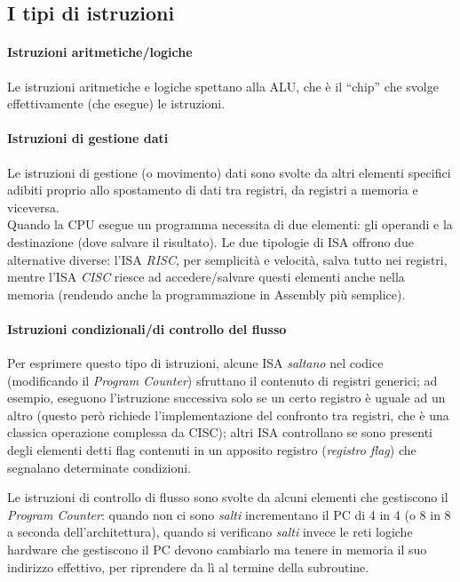 \documentclass[class=book, crop=false, oneside]{standalone}
\begin{document}
\subsection{I tipi di istruzioni}

\paragraph*{Istruzioni aritmetiche/logiche}
Le istruzioni aritmetiche e logiche spettano alla ALU, che è il “chip” che svolge effettivamente (che esegue) le istruzioni.

\paragraph*{Istruzioni di gestione dati}
Le istruzioni di gestione (o movimento) dati sono svolte da altri elementi specifici adibiti proprio allo spostamento di dati tra registri, da registri a memoria  e viceversa.\\
Quando la CPU esegue un programma necessita di due elementi: gli operandi e la destinazione (dove salvare il risultato). Le due tipologie di ISA offrono due alternative diverse: l’ISA \emph{RISC}, per semplicità  e velocità, salva tutto nei registri, mentre l’ISA \emph{CISC} riesce ad accedere/salvare questi elementi anche nella memoria (rendendo anche la programmazione in Assembly più semplice).

\paragraph*{Istruzioni condizionali/di controllo del flusso}
Per esprimere questo tipo di istruzioni, alcune ISA \emph{saltano} nel codice (modificando il \emph{Program Counter}) sfruttano il contenuto di registri generici; ad esempio, eseguono l’istruzione successiva solo se un certo registro è uguale ad un altro (questo però richiede l’implementazione del confronto tra registri, che è una classica operazione complessa da CISC); altri ISA controllano se sono presenti  degli elementi detti flag contenuti in un apposito registro (\emph{registro flag}) che segnalano determinate condizioni.

Le istruzioni di controllo di flusso sono svolte da alcuni elementi che gestiscono il \emph{Program Counter}: quando non ci sono \emph{salti} incrementano il PC di 4 in 4 (o 8 in 8 a seconda dell’architettura), quando si verificano \emph{salti} invece le reti logiche hardware che gestiscono il PC devono cambiarlo ma tenere in memoria il suo indirizzo effettivo, per riprendere da lì al termine della subroutine.
\end{document}

